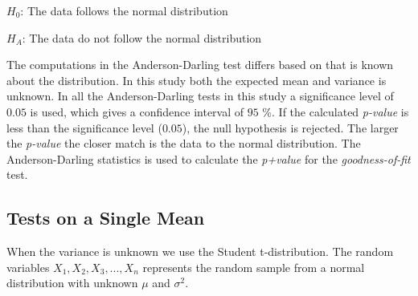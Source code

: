 \centerline{$H_{0}$: The data follows the normal distribution} 
\centerline{$H_{A}$: The data do not follow the normal distribution}

The computations in the Anderson-Darling test differs based on that is known about the distribution. In this study both the expected mean and variance is unknown. In all the Anderson-Darling tests in this study a significance level of $0.05$ is used, which gives a confidence interval of $95$ \%. If the calculated \textit{p-value} is less than the significance level ($0.05$), the null hypothesis is rejected. The larger the \textit{p-value} the closer match is the data to the normal distribution. The Anderson-Darling statistics is used to calculate the \textit{p+value} for the \textit{goodness-of-fit} test. 

\subsection{Tests on a Single Mean}
When the variance is unknown we use the Student t-distribution. The random variables $X_{1}, X_{2}, X_{3}, ..., X_{n}$ represents the random sample from a normal distribution with unknown $\mu$ and $\sigma{}^{2}$. 


